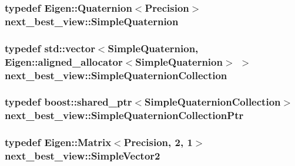 \hypertarget{namespacenext__best__view_a165f1f159539ff8e583fb7fe3620390c}{
\subsubsection[{\-Simple\-Quaternion}]{\setlength{\rightskip}{0pt plus 5cm}typedef \-Eigen\-::\-Quaternion$<${\bf \-Precision}$>$ {\bf next\-\_\-best\-\_\-view\-::\-Simple\-Quaternion}}}\label{namespacenext__best__view_a165f1f159539ff8e583fb7fe3620390c}
\hypertarget{namespacenext__best__view_a841975b577c4a40b2acabb87fd735488}{
\subsubsection[{\-Simple\-Quaternion\-Collection}]{\setlength{\rightskip}{0pt plus 5cm}typedef std\-::vector$<${\bf \-Simple\-Quaternion}, \-Eigen\-::aligned\-\_\-allocator$<${\bf \-Simple\-Quaternion}$>$ $>$ {\bf next\-\_\-best\-\_\-view\-::\-Simple\-Quaternion\-Collection}}}\label{namespacenext__best__view_a841975b577c4a40b2acabb87fd735488}
\hypertarget{namespacenext__best__view_a56eab77c28120ee9265ea6fa82a4a3c5}{
\subsubsection[{\-Simple\-Quaternion\-Collection\-Ptr}]{\setlength{\rightskip}{0pt plus 5cm}typedef boost\-::shared\-\_\-ptr$<${\bf \-Simple\-Quaternion\-Collection}$>$ {\bf next\-\_\-best\-\_\-view\-::\-Simple\-Quaternion\-Collection\-Ptr}}}\label{namespacenext__best__view_a56eab77c28120ee9265ea6fa82a4a3c5}
\hypertarget{namespacenext__best__view_aeeab418972bc511118bde8d6d016af7f}{
\subsubsection[{\-Simple\-Vector2}]{\setlength{\rightskip}{0pt plus 5cm}typedef \-Eigen\-::\-Matrix$<${\bf \-Precision}, 2, 1$>$ {\bf next\-\_\-best\-\_\-view\-::\-Simple\-Vector2}}}\label{namespacenext__best__view_aeeab418972bc511118bde8d6d016af7f}
